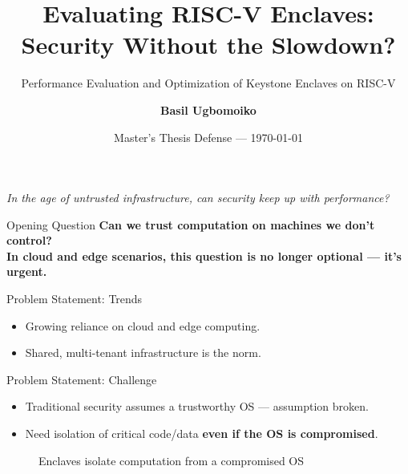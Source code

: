 \documentclass[aspectratio=169]{beamer}
\title[Evaluating RISC-V Enclaves]{\textbf{Evaluating RISC-V Enclaves:}\\ Security Without the Slowdown?}
\subtitle{Performance Evaluation and Optimization of Keystone Enclaves on RISC-V}
\author{\textbf{Basil Ugbomoiko}}
\institute[UzL]{Universität zu Lübeck \\ Institut für Technische Informatik}
\date{Master’s Thesis Defense — \today}
\begin{document}
\begin{frame}
  \titlepage
  \vfill
  \centering\small\textit{In the age of untrusted infrastructure, can security keep up with performance?}
\end{frame}

\begin{frame}{Opening Question}
\centering
\Huge\bfseries
Can we \textcolor{keystoneblue}{trust} computation on machines we \textcolor{warmaccent}{don't control}? \\[1em]
\large In cloud and edge scenarios, this question is no longer optional — it's urgent.
\end{frame}

\begin{frame}{Problem Statement: Trends}
\begin{itemize}
    \item[\faCloud] Growing reliance on \textcolor{warmaccent}{cloud} and \textcolor{warmaccent}{edge} computing.
    \item[\faUsers] Shared, multi-tenant infrastructure is the norm.
\end{itemize}
\end{frame}

\begin{frame}{Problem Statement: Challenge}
\begin{itemize}
    \item[\faExclamationTriangle] Traditional security assumes a trustworthy OS — \alert{assumption broken}.
    \item[\faLock] Need isolation of critical code/data \textbf{even if the OS is compromised}.
\end{itemize}
\vfill
\begin{figure}[h]
\centering
{}
\caption{Enclaves isolate computation from a compromised OS}
\end{figure}
\end{frame}
\end{document}
